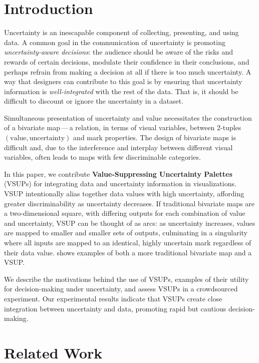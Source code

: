 \section{Introduction}
Uncertainty is an inescapable component of collecting, presenting, and using data. A common goal in the communication of uncertainty is promoting \emph{uncertainty-aware decisions}: the audience should be aware of the risks and rewards of certain decisions, modulate their confidence in their conclusions, and perhaps refrain from making a decision at all if there is too much uncertainty.  A way that designers can contribute to this goal is by ensuring that uncertainty information is \emph{well-integrated} with the rest of the data. That is, it should be difficult to discount or ignore the uncertainty in a dataset.

Simultaneous presentation of uncertainty and value necessitates the construction of a bivariate map\,---\,a relation, in terms of visual variables, between 2-tuples $(\text{value}, \text{uncertainty})$ and mark properties. The design of bivariate maps is difficult and, due to the interference and interplay between different visual variables, often leads to maps with few discriminable categories.

In this paper, we contribute \textbf{Value-Suppressing Uncertainty Palettes} (VSUPs) for integrating data and uncertainty information in visualizations.
VSUP intentionally alias together data values with high uncertainty, affording greater discriminability as uncertainty decreases. If traditional bivariate maps are a two-dimensional square, with differing outputs for each combination of value and uncertainty, VSUP can be thought of as arcs: as uncertainty increases, values are mapped to smaller and smaller sets of outputs, culminating in a singularity where all inputs are mapped to an identical, highly uncertain mark regardless of their data value.  shows examples of both a more traditional bivariate map and a VSUP.

We describe the motivations behind the use of VSUPs, examples of their utility for decision-making under uncertainty, and assess VSUPs in a crowdsourced experiment. Our experimental results indicate that VSUPs create close integration between uncertainty and data, promoting rapid but cautious decision-making.

\exampleFig
\section{Related Work}

